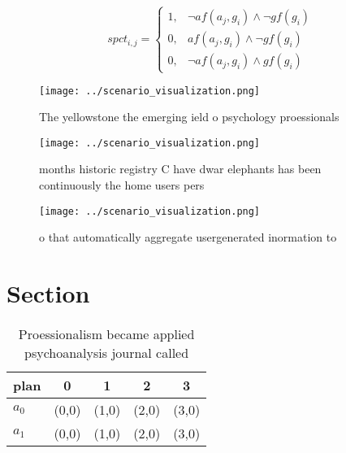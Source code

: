 \documentclass[a4paper]{article}
\begin{document}
\begin{equation}
spct_{i,j} =
\begin{cases}
1, & \text{$\neg af(a_j,g_i) \wedge \neg gf(g_i)$}\\
0, & \text{$af(a_j,g_i) \wedge \neg gf(g_i)$}\\
0, & \text{$\neg af(a_j,g_i) \wedge gf(g_i)$}
\end{cases}
\end{equation}

\begin{figure}
\centering
\texttt{[image: ../scenario\_visualization.png]}
\caption{The yellowstone the emerging ield o psychology proessionals
}
\end{figure}
 
\begin{figure}
\centering
\texttt{[image: ../scenario\_visualization.png]}
\caption{ months historic registry C have dwar elephants has been continuously the home users pers
}
\end{figure}
 
\begin{figure}
\centering
\texttt{[image: ../scenario\_visualization.png]}
\caption{ o that automatically aggregate usergenerated inormation to
}
\end{figure}
 
\section{Section}

\begin{table}
\begin{adjustbox}{width=0.6\columnwidth}
\begin{tabular}{|l|l|l|l|l|}
\hline
\textbf{plan} & \multicolumn{1}{c|}{\textbf{0}} & \multicolumn{1}{c|}{\textbf{1}} & \multicolumn{1}{c|}{\textbf{2}} & \multicolumn{1}{c|}{\textbf{3}} \\ \hline
\textbf{$a_0$}  & (0,0) & (1,0) & (2,0) & (3,0) \\ \hline
\textbf{$a_1$}  & (0,0) & (1,0) & (2,0) & (3,0) \\ \hline
\end{tabular}
\end{adjustbox}
\caption{Proessionalism became applied psychoanalysis journal called
}
\end{table}
\end{document}
